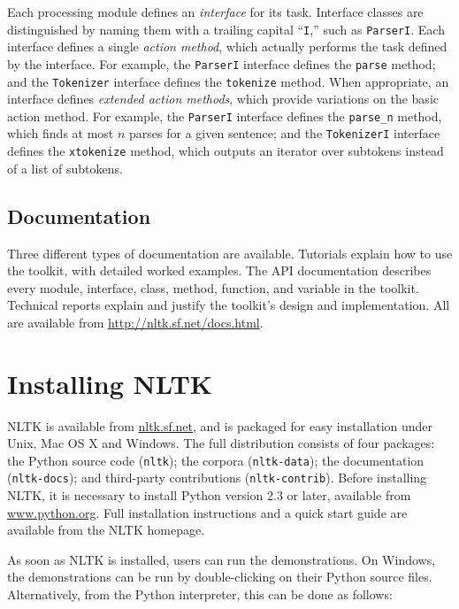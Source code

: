 \documentclass[11pt]{article}
\def\object#1{\texttt{\small #1}}
\begin{document}
Each processing module defines an \emph{interface} for its task.
Interface classes are distinguished by naming them with a trailing
capital ``\object{I},'' such as \object{ParserI}.
Each interface defines a single \emph{action method}, which actually
performs the task defined by the interface.  For example, the
\object{ParserI} interface defines the \object{parse} method; and the
\object{Tokenizer} interface defines the \object{tokenize} method.
When appropriate, an interface defines \emph{extended action
  methods}, which provide variations on the basic action method.  For
example, the \object{ParserI} interface defines the \object{parse\_n}
method, which finds at most $n$ parses for a given sentence; and
the \object{TokenizerI} interface defines the \object{xtokenize}
method, which outputs an iterator over subtokens instead of a list of
subtokens.

\subsection{Documentation}

Three different types of documentation are available.  Tutorials
explain how to use the toolkit, with detailed worked examples.  The
API documentation describes every module, interface, class, method,
function, and variable in the toolkit.  Technical reports explain and
justify the toolkit's design and implementation.  All are available
from \url{http://nltk.sf.net/docs.html}.

\section{Installing NLTK}

NLTK is available from \url{nltk.sf.net}, and is packaged for
easy installation under Unix, Mac OS X and Windows.  The full
distribution consists of four packages: the Python source code
(\object{nltk}); the corpora (\object{nltk-data}); the documentation
(\object{nltk-docs}); and third-party contributions
(\object{nltk-contrib}).  Before installing NLTK, it is necessary to
install Python version 2.3 or later, available from
\url{www.python.org}.  Full installation instructions and a quick
start guide are available from the NLTK homepage.

As soon as NLTK is installed, users can run the demonstrations.  On
Windows, the demonstrations can be run by double-clicking on their
Python source files.  Alternatively, from the Python interpreter, this
can be done as follows:
\end{document}
